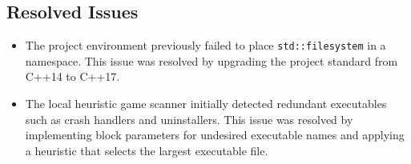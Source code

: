 \subsection*{Resolved Issues}

\begin{itemize}

\item The project environment previously failed to place \texttt{std::filesystem} in a namespace.
This issue was resolved by upgrading the project standard from C++14 to C++17.

\item The local heuristic game scanner initially detected redundant executables such as crash
handlers and uninstallers. This issue was resolved by implementing block parameters for
undesired executable names and applying a heuristic that selects the largest executable file.

\end{itemize}
